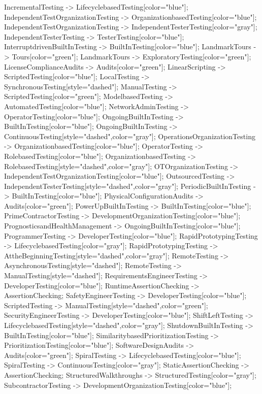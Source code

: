\documentclass{article}
\begin{document}
{IncrementalTesting -> LifecyclebasedTesting[color="blue"];
IndependentTestOrganizationTesting -> OrganizationbasedTesting[color="blue"];
IndependentTestOrganizationTesting -> IndependentTesterTesting[color="gray"];
IndependentTesterTesting -> TesterTesting[color="blue"];
InterruptdrivenBuiltInTesting -> BuiltInTesting[color="blue"];
LandmarkTours -> Tours[color="green"];
LandmarkTours -> ExploratoryTesting[color="green"];
LicenseComplianceAudits -> Audits[color="green"];
LinearScripting -> ScriptedTesting[color="blue"];
LocalTesting -> SynchronousTesting[style="dashed"];
ManualTesting -> ScriptedTesting[color="green"];
ModelbasedTesting -> AutomatedTesting[color="blue"];
NetworkAdminTesting -> OperatorTesting[color="blue"];
OngoingBuiltInTesting -> BuiltInTesting[color="blue"];
OngoingBuiltInTesting -> ContinuousTesting[style="dashed",color="gray"];
OperationsOrganizationTesting -> OrganizationbasedTesting[color="blue"];
OperatorTesting -> RolebasedTesting[color="blue"];
OrganizationbasedTesting -> RolebasedTesting[style="dashed",color="gray"];
OTOrganizationTesting -> IndependentTestOrganizationTesting[color="blue"];
OutsourcedTesting -> IndependentTesterTesting[style="dashed",color="gray"];
PeriodicBuiltInTesting -> BuiltInTesting[color="blue"];
PhysicalConfigurationAudits -> Audits[color="green"];
PowerUpBuiltInTesting -> BuiltInTesting[color="blue"];
PrimeContractorTesting -> DevelopmentOrganizationTesting[color="blue"];
PrognosticsandHealthManagement -> OngoingBuiltInTesting[color="blue"];
ProgrammerTesting -> DeveloperTesting[color="blue"];
RapidPrototypingTesting -> LifecyclebasedTesting[color="gray"];
RapidPrototypingTesting -> AttheBeginningTesting[style="dashed",color="gray"];
RemoteTesting -> AsynchronousTesting[style="dashed"];
RemoteTesting -> ManualTesting[style="dashed"];
RequirementsEngineerTesting -> DeveloperTesting[color="blue"];
RuntimeAssertionChecking -> AssertionChecking;
SafetyEngineerTesting -> DeveloperTesting[color="blue"];
ScriptedTesting -> ManualTesting[style="dashed",color="green"];
SecurityEngineerTesting -> DeveloperTesting[color="blue"];
ShiftLeftTesting -> LifecyclebasedTesting[style="dashed",color="gray"];
ShutdownBuiltInTesting -> BuiltInTesting[color="blue"];
SimilaritybasedPrioritizationTesting -> PrioritizationTesting[color="blue"];
SoftwareDesignAudits -> Audits[color="green"];
SpiralTesting -> LifecyclebasedTesting[color="blue"];
SpiralTesting -> ContinuousTesting[color="gray"];
StaticAssertionChecking -> AssertionChecking;
StructuredWalkthroughs -> StructuredTesting[color="gray"];
SubcontractorTesting -> DevelopmentOrganizationTesting[color="blue"];
}
\end{document}
